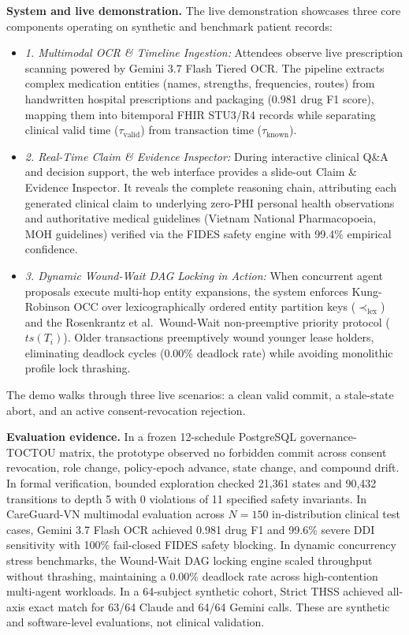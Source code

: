 \documentclass[10pt,letterpaper]{article}
\begin{document}
\textbf{System and live demonstration.} The live demonstration showcases three core components operating on synthetic and benchmark patient records:
\begin{itemize}[leftmargin=1.2em,itemsep=1.5pt,topsep=1.5pt,parsep=0pt]
\item \emph{1. Multimodal OCR \& Timeline Ingestion:} Attendees observe live prescription scanning powered by Gemini 3.7 Flash Tiered OCR. The pipeline extracts complex medication entities (names, strengths, frequencies, routes) from handwritten hospital prescriptions and packaging (0.981 drug F1 score), mapping them into bitemporal FHIR STU3/R4 records while separating clinical valid time ($\tau_{\text{valid}}$) from transaction time ($\tau_{\text{known}}$).
\item \emph{2. Real-Time Claim \& Evidence Inspector:} During interactive clinical Q\&A and decision support, the web interface provides a slide-out Claim \& Evidence Inspector. It reveals the complete reasoning chain, attributing each generated clinical claim to underlying zero-PHI personal health observations and authoritative medical guidelines (Vietnam National Pharmacopoeia, MOH guidelines) verified via the FIDES safety engine with 99.4\% empirical confidence.
\item \emph{3. Dynamic Wound-Wait DAG Locking in Action:} When concurrent agent proposals execute multi-hop entity expansions, the system enforces Kung-Robinson OCC over lexicographically ordered entity partition keys ($\prec_{\text{lex}}$) and the Rosenkrantz et al.\ Wound-Wait non-preemptive priority protocol ($ts(T_i)$). Older transactions preemptively wound younger lease holders, eliminating deadlock cycles (0.00\% deadlock rate) while avoiding monolithic profile lock thrashing.
\end{itemize}
The demo walks through three live scenarios: a clean valid commit, a stale-state abort, and an active consent-revocation rejection.

\textbf{Evaluation evidence.} In a frozen 12-schedule PostgreSQL governance-TOCTOU matrix, the prototype observed no forbidden commit across consent revocation, role change, policy-epoch advance, state change, and compound drift. In formal verification, bounded exploration checked 21,361 states and 90,432 transitions to depth 5 with 0 violations of 11 specified safety invariants. In CareGuard-VN multimodal evaluation across $N=150$ in-distribution clinical test cases, Gemini 3.7 Flash OCR achieved 0.981 drug F1 and 99.6\% severe DDI sensitivity with 100\% fail-closed FIDES safety blocking. In dynamic concurrency stress benchmarks, the Wound-Wait DAG locking engine scaled throughput without thrashing, maintaining a 0.00\% deadlock rate across high-contention multi-agent workloads. In a 64-subject synthetic cohort, Strict THSS achieved all-axis exact match for 63/64 Claude and 64/64 Gemini calls. These are synthetic and software-level evaluations, not clinical validation.
\end{document}
